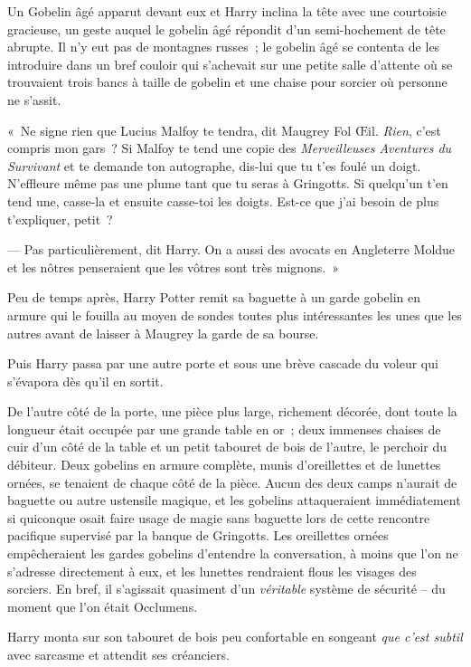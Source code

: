 Un Gobelin âgé apparut devant eux et Harry inclina la tête avec une courtoisie gracieuse, un geste auquel le gobelin âgé répondit d'un semi-hochement de tête abrupte.
Il n'y eut pas de montagnes russes~; le gobelin âgé se contenta de les introduire dans un bref couloir qui s'achevait sur une petite salle d'attente où se trouvaient trois bancs à taille de gobelin et une chaise pour sorcier où personne ne s'assit.

«~Ne signe rien que Lucius Malfoy te tendra, dit Maugrey Fol Œil.
\emph{Rien}, c'est compris mon gars~?
Si Malfoy te tend une copie des \emph{Merveilleuses Aventures du Survivant} et te demande ton autographe, dis-lui que tu t'es foulé un doigt.
N'effleure même pas une plume tant que tu seras à Gringotts.
Si quelqu'un t'en tend une, casse-la et ensuite casse-toi les doigts.
Est-ce que j'ai besoin de plus t'expliquer, petit~?

--- Pas particulièrement, dit Harry.
On a aussi des avocats en Angleterre Moldue et les nôtres penseraient que les vôtres sont très mignons.~»

Peu de temps après, Harry Potter remit sa baguette à un garde gobelin en armure qui le fouilla au moyen de sondes toutes plus intéressantes les unes que les autres avant de laisser à Maugrey la garde de sa bourse.

Puis Harry passa par une autre porte et sous une brève cascade du voleur qui s'évapora dès qu'il en sortit.

De l'autre côté de la porte, une pièce plus large, richement décorée, dont toute la longueur était occupée par une grande table en or~; deux immenses chaises de cuir d'un côté de la table et un petit tabouret de bois de l'autre, le perchoir du débiteur.
Deux gobelins en armure complète, munis d'oreillettes et de lunettes ornées, se tenaient de chaque côté de la pièce.
Aucun des deux camps n'aurait de baguette ou autre ustensile magique, et les gobelins attaqueraient immédiatement si quiconque osait faire usage de magie sans baguette lors de cette rencontre pacifique supervisé par la banque de Gringotts.
Les oreillettes ornées empêcheraient les gardes gobelins d'entendre la conversation, à moins que l'on ne s'adresse directement à eux, et les lunettes rendraient flous les visages des sorciers.
En bref, il s'agissait quasiment d'un \emph{véritable} système de sécurité -- du moment que l'on était Occlumens.

Harry monta sur son tabouret de bois peu confortable en songeant \emph{que c'est subtil} avec sarcasme et attendit ses créanciers.

